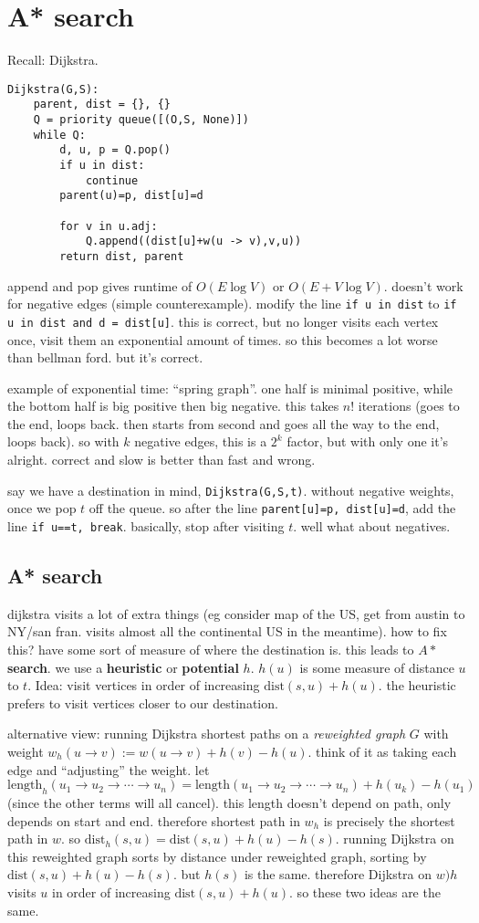 \section{A* search} 
Recall: Dijkstra. 
\begin{verbatim}
Dijkstra(G,S):
    parent, dist = {}, {}
    Q = priority queue([(O,S, None)])
    while Q:
        d, u, p = Q.pop()
        if u in dist:
            continue
        parent(u)=p, dist[u]=d 

        for v in u.adj:
            Q.append((dist[u]+w(u -> v),v,u))
        return dist, parent
\end{verbatim}
append and pop gives runtime of $O(E \log V) $ or $O(E+V \log V)$. doesn't work for negative edges (simple counterexample). modify the line  \texttt{if u in dist} to \texttt{if u in dist and d = dist[u]}. this is correct, but no longer visits each vertex once, visit them an exponential amount of times. so this becomes a lot worse than bellman ford. but it's correct.

example of exponential time: ``spring graph''. one half is minimal positive, while the bottom half is big positive then big negative. this takes $n!$ iterations (goes to the end, loops back. then starts from second and goes all the way to the end, loops back). so with $k$ negative edges, this is a $2^k $ factor, but with only one it's alright. correct and slow is better than fast and wrong.

say we have a destination in mind, \texttt{Dijkstra(G,S,t)}. without negative weights, once we pop $t$ off the queue. so after the line \texttt{parent[u]=p, dist[u]=d}, add the line \texttt{if u==t, break}. basically, stop after visiting $t$. well what about negatives.

\subsection{A* search}
dijkstra visits a lot of extra things (eg consider map of the US, get from austin to NY/san fran. visits almost all the continental US in the meantime). how to fix this? have some sort of measure of where the destination is. this leads to $A*$ \textbf{search}. we use a \textbf{heuristic} or \textbf{potential} $h$. $h(u)$ is some measure of distance $u$ to $t$. Idea: visit vertices in order of increasing $\mathrm{dist}(s,u)+h(u)$. the heuristic prefers to visit vertices closer to our destination.

alternative view: running Dijkstra shortest paths on a \emph{reweighted graph} $G$ with weight $w_h(u \to v):=w(u \to v) +h(v)-h(u)$. think of it as taking each edge and ``adjusting'' the weight. let $\mathrm{length}_h(u_1 \to u_2 \to \cdots \to u_n )=\mathrm{length}(u_1 \to u_2 \to  \cdots \to  u_n )+h(u_k)-h(u_1)$ (since the other terms will all cancel). this length doesn't depend on path, only depends on start and end. therefore shortest path in $w_h$ is precisely the shortest path in $w$. so $\mathrm{dist}_h(s,u)=\mathrm{dist}(s,u)+h(u)-h(s)$. running Dijkstra on this reweighted graph sorts by distance under reweighted graph, sorting by $\mathrm{dist}(s,u)+h(u)-h(s)$. but $h(s)$ is the same. therefore Dijkstra on $w)h$ visits  $u$ in order of increasing $\mathrm{dist}(s,u)+h(u)$. so these two ideas are the same.

